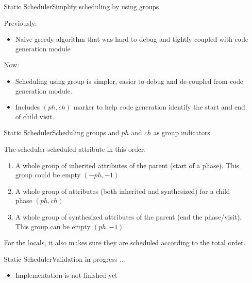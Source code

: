 \begin{frame}{Static Scheduler}{Simplify scheduling by using groups}

Previously:
\begin{itemize}
    \item Naive \alert{greedy algorithm} that was hard to debug and \alert{tightly coupled with code generation} module
\end{itemize}
    
Now:
\begin{itemize}
    \item Scheduling using group is simpler, easier to debug and \alert{de-coupled from code generation} module.
    \item Includes $(\mathit{ph}, \mathit{ch})$ marker to help code generation identify the start and end of child visit.
\end{itemize}

\end{frame}


\begin{frame}{Static Scheduler}{Scheduling groups and $ph$ and $ch$ as group indicators}

The scheduler scheduled attribute in this order:
\begin{enumerate}
    \item A whole group of inherited attributes of the parent (start of a phase). This group could be empty $(-ph, -1)$
    \item A whole group of attributes (both inherited and synthesized) for a child phase  $(ph, ch)$
    \item A whole group of synthesized attributes of the parent (end the phase/visit). This group can be empty $(ph, -1)$
\end{enumerate}


 For the locals, it also makes sure they are scheduled according to the total order.
 
\end{frame}


\begin{frame}{Static Scheduler}{Validation in-progress ...}

\begin{itemize}
    \item Implementation is \alert{not finished yet}
\end{itemize}

\end{frame}